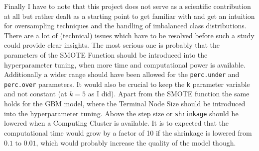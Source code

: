 \documentclass[12pt,a4paper]{article}
\begin{document}
Finally I have to note that this project does not serve as a scientific contribution at all but rather dealt as a starting point to get familiar with and get an intuition for oversampling techniques and the handling of imbalanced class distributions. There are a lot of (technical) issues which have to be resolved before such a study could provide clear insights. The most serious one is probably that the parameters of the SMOTE Function should be introduced into the hyperparameter tuning, when more time and computational power is available. Additionally a wider range should have been allowed for the \verb+perc.under+ and \verb+perc.over+ parameters. It would also be crucial to keep the \verb+k+ parameter variable and not constant (at $k=5$ as I did). Apart from the SMOTE function the same holds for the GBM model, where the Terminal Node Size should be introduced into the hyperparameter tuning. Above the step size or \verb+shrinkage+ should be lowered when a Computing Cluster is available. It is to expected that the computational time would grow by a factor of 10 if the shrinkage is lowered from $0.1$ to $0.01$, which would probably increase the quality of the model though. 
\pagebreak
\clearpage
 

\clearpage
\pagebreak
\listoffigures
\clearpage
\pagebreak
\listoftables
\pagebreak
{}
\end{document}
